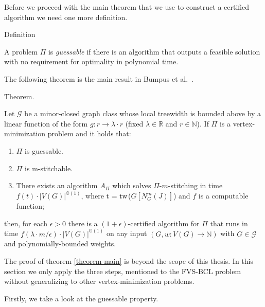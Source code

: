  Before we proceed with the main theorem that we use to construct a certified algorithm 
we need one more definition.

\begin{mydefinition}[Guessable]{Definition}
    \label{guessable}

     A problem $\Pi$ is \emph{guessable} if there is an algorithm that outputs a feasible solution 
    with no requirement for optimality in polynomial time.

\end{mydefinition}

 The following theorem is the main result in 
Bumpus et al.~\cite[Theorem 1.7]{bumpus_et_al:LIPIcs.SWAT.2024.19}.

\begin{mydefinition}{Theorem.}
    \label{theorem-main}

    Let $\mathcal{G}$ be a minor-closed graph class whose local treewidth is bounded above by a linear 
    function of the form $g : r \to \lambda \cdot r$ (fixed $\lambda \in \mathbb{R}$ and $r \in \mathbb{N}$).
    If $\Pi$ is a vertex-minimization problem and it holds that:

    \begin{enumerate}
        \item $\Pi$ is guessable.
        \item $\Pi$ is m-stitchable.
        \item There exists an algorithm $A_{\Pi}$ which solves $\Pi$-$m$-stitching in time $f(t) \cdot  |V(G)|^{\mathbb{O}(1)}$,
        where t = $\operatorname{tw}$($G\left[N^{m}_{G}(J)\right]$) and $f$ is a computable function;
    \end{enumerate}

    then, for each $\epsilon > 0$ there is a $(1 + \epsilon)$-certified algorithm for $\Pi$ that 
    runs in time $f(\lambda \cdot m / \epsilon) \cdot \left|V(G)\right| ^ {\mathbb{O}(1)}$ 
    on any input $(G, w : V(G) \to \mathbb{N})$ with $G \in \mathcal{G}$ and 
    polynomially-bounded weights.

\end{mydefinition}

The proof of theorem \ref{theorem-main} is beyond the scope of this thesis. In this section 
we only apply the three steps, mentioned to the FVS-BCL problem without generalizing to other 
vertex-minimization problems. 

 Firstly, we take a look at the guessable property.

